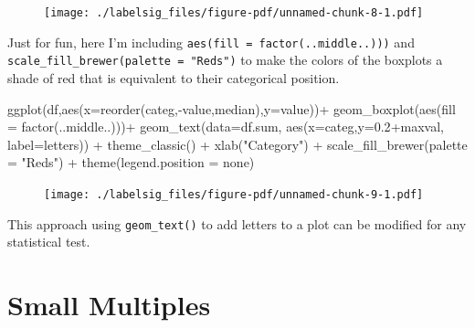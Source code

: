 \documentclass[
  letterpaper,
  DIV=11,
  numbers=noendperiod]{scrreprt}
\newenvironment{Shaded}{\begin{snugshade}}{\end{snugshade}}
\newcommand{\AttributeTok}[1]{\textcolor[rgb]{0.40,0.45,0.13}{#1}}
\newcommand{\FloatTok}[1]{\textcolor[rgb]{0.68,0.00,0.00}{#1}}
\newcommand{\FunctionTok}[1]{\textcolor[rgb]{0.28,0.35,0.67}{#1}}
\newcommand{\NormalTok}[1]{\textcolor[rgb]{0.00,0.23,0.31}{#1}}
\newcommand{\SpecialCharTok}[1]{\textcolor[rgb]{0.37,0.37,0.37}{#1}}
\newcommand{\StringTok}[1]{\textcolor[rgb]{0.13,0.47,0.30}{#1}}
\begin{document}
\begin{figure}[H]

{\centering \texttt{[image: ./labelsig\_files/figure-pdf/unnamed-chunk-8-1.pdf]}

}

\end{figure}

Just for fun, here I'm including
\texttt{aes(fill\ =\ factor(..middle..)))} and
\texttt{scale\_fill\_brewer(palette\ =\ "Reds")} to make the colors of
the boxplots a shade of red that is equivalent to their categorical
position.

\begin{Shaded}
\begin{Highlighting}[]
\FunctionTok{ggplot}\NormalTok{(df,}\FunctionTok{aes}\NormalTok{(}\AttributeTok{x=}\FunctionTok{reorder}\NormalTok{(categ,}\SpecialCharTok{{-}}\NormalTok{value,median),}\AttributeTok{y=}\NormalTok{value))}\SpecialCharTok{+}
  \FunctionTok{geom\_boxplot}\NormalTok{(}\FunctionTok{aes}\NormalTok{(}\AttributeTok{fill =} \FunctionTok{factor}\NormalTok{(..middle..)))}\SpecialCharTok{+}
  \FunctionTok{geom\_text}\NormalTok{(}\AttributeTok{data=}\NormalTok{df.sum,}
            \FunctionTok{aes}\NormalTok{(}\AttributeTok{x=}\NormalTok{categ,}\AttributeTok{y=}\FloatTok{0.2}\SpecialCharTok{+}\NormalTok{maxval,}
                \AttributeTok{label=}\NormalTok{letters)) }\SpecialCharTok{+}
  \FunctionTok{theme\_classic}\NormalTok{() }\SpecialCharTok{+}
  \FunctionTok{xlab}\NormalTok{(}\StringTok{"Category"}\NormalTok{) }\SpecialCharTok{+}
  \FunctionTok{scale\_fill\_brewer}\NormalTok{(}\AttributeTok{palette =} \StringTok{"Reds"}\NormalTok{) }\SpecialCharTok{+}
  \FunctionTok{theme}\NormalTok{(}\AttributeTok{legend.position =} \StringTok{\textquotesingle{}none\textquotesingle{}}\NormalTok{)}
\end{Highlighting}
\end{Shaded}

\begin{figure}[H]

{\centering \texttt{[image: ./labelsig\_files/figure-pdf/unnamed-chunk-9-1.pdf]}

}

\end{figure}

This approach using \texttt{geom\_text()} to add letters to a plot can
be modified for any statistical test.


\hypertarget{small-multiples}{%
\chapter{Small Multiples}\label{small-multiples}}
\end{document}
